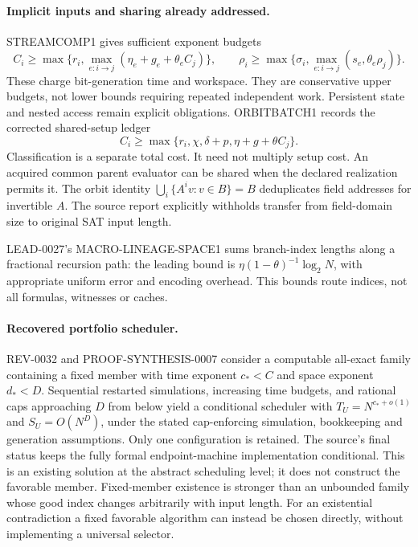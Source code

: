 \documentclass[11pt]{article}
\begin{document}
\paragraph{Implicit inputs and sharing already addressed.}
STREAMCOMP1 gives sufficient exponent budgets
\[
C_i\ge\max\{r_i,\max_{e:i\to j}(\eta_e+g_e+\theta_eC_j)\},\qquad
\rho_i\ge\max\{\sigma_i,\max_{e:i\to j}(s_e,\theta_e\rho_j)\}.
\]
These charge bit-generation time and workspace. They are conservative upper
budgets, not lower bounds requiring repeated independent work. Persistent
state and nested access remain explicit obligations.
ORBITBATCH1 records the corrected shared-setup ledger
\[
C_i\ge\max\{r_i,\chi,\delta+p,\eta+g+\theta C_j\}.
\]
Classification is a separate total cost. It need not multiply setup cost.
An acquired common parent evaluator can be shared when the declared realization
permits it. The orbit identity $\bigcup_i\{A^iv:v\in B\}=B$ deduplicates field
addresses for invertible $A$. The source report explicitly withholds transfer
from field-domain size to original SAT input length.

LEAD-0027's MACRO-LINEAGE-SPACE1 sums branch-index lengths along a fractional
recursion path: the leading bound is
$\eta(1-\theta)^{-1}\log_2N$, with appropriate uniform error and encoding
overhead. This bounds route indices, not all formulas, witnesses or caches.

\paragraph{Recovered portfolio scheduler.}
REV-0032 and PROOF-SYNTHESIS-0007 consider a computable all-exact family
containing a fixed member with time exponent $c_*<C$ and space exponent $d_*<D$.
Sequential restarted simulations, increasing time budgets, and rational caps
approaching $D$ from below yield a conditional scheduler with
$T_U=N^{c_*+o(1)}$ and $S_U=O(N^D)$, under the stated cap-enforcing simulation,
bookkeeping and generation assumptions. Only one configuration is retained.
The source's final status keeps the fully formal endpoint-machine implementation
conditional. This is an existing solution at the abstract scheduling level;
it does not construct the favorable member. Fixed-member existence is stronger
than an unbounded family whose good index changes arbitrarily with input length.
For an existential contradiction a fixed favorable algorithm can instead be
chosen directly, without implementing a universal selector.
\end{document}

